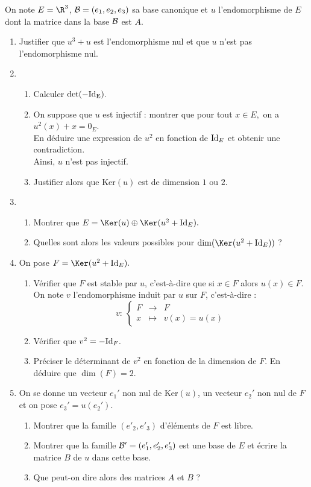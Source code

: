 \documentclass[twoside,french,11pt]{VcCours}
\begin{document}
  On note $E=\R^3$, ${\cal B}=(e_1,e_2,e_3)$ sa base canonique et $u$ l'endomorphisme de $E$ dont la matrice dans la base ${\cal B}$ est $A.$
  \begin{enumerate}
    \item Justifier que $u^3+u$ est l'endomorphisme nul et que $u$ n'est pas l'endomorphisme nul.
    \item 
    \begin{enumerate}
      \item Calculer $\det(-{\rm Id_E}).$
      \item On suppose que $u$ est injectif : montrer que pour tout $x\in E,$ on a $u^2(x)+x=0_E$.\\
      En déduire une expression de $u^2$ en fonction de ${\rm Id}_E$ et obtenir une contradiction.\\
      Ainsi, $u$ n'est pas injectif.
      \item Justifier alors que Ker$(u)$ est de dimension $1$ ou $2.$
    \end{enumerate}
    \item 
    \begin{enumerate}
      \item Montrer que $E=\Ker(u)\oplus\Ker(u^2+{\rm Id}_E).$
      \item Quelles sont alors les valeurs possibles pour $\dim(\Ker(u^2+{\rm Id}_E))$ ?
    \end{enumerate}
    \item On pose $F=\Ker(u^2+{\rm Id}_E).$
    \begin{enumerate}
      \item Vérifier que $F$ est stable par $u$, c'est-à-dire que si $x\in F$ alors $u(x)\in F.$
      On note $v$ l'endomorphisme induit par $u$ sur $F$, c'est-à-dire :
      $$v : \ \left\{\begin{array}{rcl}
      F & \longrightarrow & F\\
      x & \longmapsto & v(x)=u(x)\end{array}\right.$$
      \item Vérifier que $v^2=-{\rm Id}_F.$
      \item Préciser le déterminant de $v^2$ en fonction de la dimension de $F.$ En déduire que $\dim(F)=2.$
    \end{enumerate}
    \item On se donne un vecteur $e_1'$ non nul de Ker$(u)$, un vecteur $e_2'$ non nul de $F$ et on pose $e_3'=u(e_2').$
    \begin{enumerate}
      \item Montrer que la famille $(e'_2,e'_3)$ d'éléments de $F$ est libre.
      \item Montrer que la famille ${\cal B}'=(e'_1,e'_2,e'_3)$ est une base de $E$ et écrire la matrice $B$ de $u$ dans cette base.
      \item Que peut-on dire alors des matrices $A$ et $B$ ?
    \end{enumerate}
  \end{enumerate}
\end{document}
